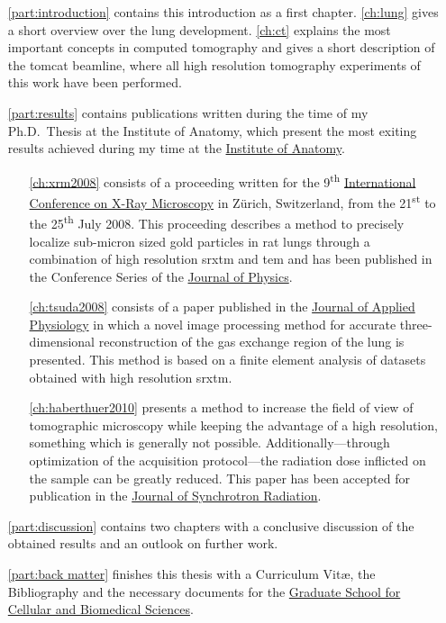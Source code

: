 \begin{itemize}
	\item [\autoref{part:introduction}] contains this introduction as a first chapter. \autoref{ch:lung} gives a short overview over the lung development. \autoref{ch:ct} explains the most important concepts in computed tomography and gives a short description of the \ac{tomcat} beamline, where all high resolution tomography experiments of this work have been performed.
	\item [\autoref{part:results}] contains publications written during the time of my Ph.D.\ Thesis at the Institute of Anatomy, which present the most exiting results achieved during my time at the \href{http://www.ana.unibe.ch/index_e.jsp}{Institute of Anatomy}.
	\begin{itemize}
		\item [\autoref{ch:xrm2008}] consists of a proceeding written for the 9\textsuperscript{th} \href{http://xrm2008.web.psi.ch/}{International Conference on X-Ray Microscopy} in Zürich, Switzerland, from the 21\textsuperscript{st} to the 25\textsuperscript{th} July 2008. This proceeding describes a method to precisely localize sub-micron sized gold particles in rat lungs through a combination of high resolution \acl{srxtm} and \acl{tem} and has been published in the Conference Series of the \href{http://iopscience.iop.org/1742-6596/}{Journal of Physics}.
		
		\item [\autoref{ch:tsuda2008}] consists of a paper published in the \href{http://jap.physiology.org/}{Journal of Applied Physiology} in which a novel image processing method for accurate three-dimensional reconstruction of the gas exchange region of the lung is presented. This method is based on a finite element analysis of datasets obtained with high resolution \acl{srxtm}.

		\item [\autoref{ch:haberthuer2010}] presents a method to increase the field of view of tomographic microscopy while keeping the advantage of a high resolution, something which is generally not possible. Additionally---through optimization of the acquisition protocol---the radiation dose inflicted on the sample can be greatly reduced. This paper has been accepted for publication in the \href{http://journals.iucr.org/s/}{Journal of Synchrotron Radiation}.
	\end{itemize}
	\item [\autoref{part:discussion}] contains two chapters with a conclusive discussion of the obtained results and an outlook on further work.
	\item [\autoref{part:back matter}] finishes this thesis with a Curriculum Vit\ae, the Bibliography and the necessary documents for the \href{http://www.gcb.unibe.ch}{Graduate School for Cellular and Biomedical Sciences}.
\end{itemize}
